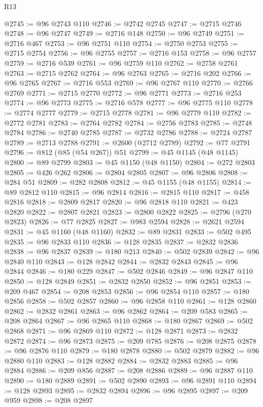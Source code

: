 \begin{lexlean}{R13}
\begin{coremodule}
{{{{{{{{{{{{{{{{{{{{{{{{{{{{{{{{{{{{{{{{{{{{{{{{{{{{{{{{{{{{{{{{{{{{{{{{{{{{{{{{{{{{{{{{{{{{{{{{{{{{{{{{{{@2745 := @96 @2743 @110
@2746 := @2742 @2745
@2747 := @2715 @2746
@2748 := @96 @2747
@2749 := @2716 @148
@2750 := @96 @2749
@2751 := @2716 @467
@2753 := @96 @2751 @110
@2754 := @2750 @2753
@2755 := @2715 @2754
@2756 := @96 @2755
@2757 := @2716 @153
@2758 := @96 @2757
@2759 := @2716 @539
@2761 := @96 @2759 @110
@2762 := @2758 @2761
@2763 := @2715 @2762
@2764 := @96 @2763
@2765 := @2716 @202
@2766 := @96 @2765
@2767 := @2716 @553
@2769 := @96 @2767 @110
@2770 := @2766 @2769
@2771 := @2715 @2770
@2772 := @96 @2771
@2773 := @2716 @253
@2774 := @96 @2773
@2775 := @2716 @578
@2777 := @96 @2775 @110
@2778 := @2774 @2777
@2779 := @2715 @2778
@2781 := @96 @2779 @110
@2782 := @2772 @2781
@2783 := @2764 @2782
@2784 := @2756 @2783
@2785 := @2748 @2784
@2786 := @2740 @2785
@2787 := @2732 @2786
@2788 := @2724 @2787
@2789 := @2713 @2788
@2791 := @2600 (@2712 @2789)
@2792 := @77 @2791
@2796 := @812 (@85 (@54 @267)) @51
@2799 := @45 @1145 (@48 @1145)
@2800 := @89 @2799
@2803 := @45 @1150 (@48 @1150)
@2804 := @272 @2803
@2805 := @426 @262
@2806 := @2804 @2805
@2807 := @96 @2806
@2808 := @284 @51
@2809 := @282 @2808
@2812 := @45 @1155 (@48 @1155)
@2814 := @89 @2812 @110
@2815 := @96 @2814
@2816 := @2815 @110
@2817 := @458 @2816
@2818 := @2809 @2817
@2820 := @96 @2818 @110
@2821 := @423 @2820
@2822 := @2807 @2821
@2823 := @2800 @2822
@2825 := @2796 (@270 @2823)
@2826 := @77 @2825
@2827 := @983 @2594
@2828 := @2621 @2594
@2831 := @45 @1160 (@48 @1160)
@2832 := @89 @2831
@2833 := @502 @495
@2835 := @96 @2833 @110
@2836 := @128 @2835
@2837 := @2832 @2836
@2838 := @96 @2837
@2839 := @180 @213
@2840 := @502 @2839
@2842 := @96 @2840 @110
@2843 := @128 @2842
@2844 := @2832 @2843
@2845 := @96 @2844
@2846 := @180 @229
@2847 := @502 @2846
@2849 := @96 @2847 @110
@2850 := @128 @2849
@2851 := @2832 @2850
@2852 := @96 @2851
@2853 := @209 @467
@2854 := @208 @2853
@2856 := @96 @2854 @110
@2857 := @180 @2856
@2858 := @502 @2857
@2860 := @96 @2858 @110
@2861 := @128 @2860
@2862 := @2832 @2861
@2863 := @96 @2862
@2864 := @209 @583
@2865 := @208 @2864
@2867 := @96 @2865 @110
@2868 := @180 @2867
@2869 := @502 @2868
@2871 := @96 @2869 @110
@2872 := @128 @2871
@2873 := @2832 @2872
@2874 := @96 @2873
@2875 := @209 @785
@2876 := @208 @2875
@2878 := @96 @2876 @110
@2879 := @180 @2878
@2880 := @502 @2879
@2882 := @96 @2880 @110
@2883 := @128 @2882
@2884 := @2832 @2883
@2885 := @96 @2884
@2886 := @209 @856
@2887 := @208 @2886
@2889 := @96 @2887 @110
@2890 := @180 @2889
@2891 := @502 @2890
@2893 := @96 @2891 @110
@2894 := @128 @2893
@2895 := @2832 @2894
@2896 := @96 @2895
@2897 := @209 @959
@2898 := @208 @2897
}}}}}}}}}}}}}}}}}}}}}}}}}}}}}}}}}}}}}}}}}}}}}}}}}}}}}}}}}}}}}}}}}}}}}}}}}}}}}}}}}}}}}}}}}}}}}}}}}}}}}}}}}}
\end{coremodule}
\end{lexlean}
